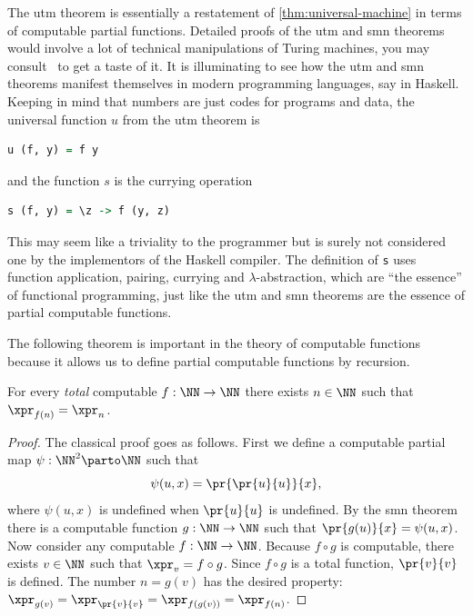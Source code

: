\noindent
The utm theorem is essentially a restatement of
\cref{thm:universal-machine} in terms of computable partial
functions. Detailed proofs of the utm and smn theorems would involve
a lot of technical manipulations of Turing machines, you may consult~ to get a taste of it.
It is illuminating to see how the utm and smn theorems manifest themselves in modern programming languages, say in Haskell. Keeping in mind that numbers are just codes for programs and data, the universal function $u$ from the utm theorem is
%
\begin{lstlisting}[language=Haskell]
u (f, y) = f y
\end{lstlisting}
%
and the function $s$ is the currying operation
%
\begin{lstlisting}[language=Haskell]
s (f, y) = \z -> f (y, z)
\end{lstlisting}
%
This may seem like a triviality to the programmer but is surely not
considered one by the implementors of the Haskell compiler. The definition of \lstinline!s! uses function application, pairing, currying and $\lambda$-abstraction, which are ``the essence'' of functional programming, just like the utm and smn theorems are the essence of partial computable functions.

The following theorem is important in the theory of computable
functions because it allows us to define partial computable functions
by recursion.

\begin{theorem}
  For every \emph{total} computable $f : \NN \to \NN$ there exists $n
  \in \NN$ such that $\xpr_{f(n)} = \xpr_{n}$.
\end{theorem}

\begin{proof}
  The classical proof goes as follows. First we define a computable
  partial map $\psi : \NN^2 \parto \NN$ such that
  \begin{equation*}
    \psi(u, x) = \pr{\pr{u}{u}}{x},
  \end{equation*}
  where $\psi(u, x)$ is undefined when $\pr{u}{u}$ is undefined.
  By the smn theorem there is a computable function $g : \NN \to \NN$
  such that $\pr{g(u)}{x} = \psi(u, x)$. Now consider any computable
  $f : \NN \to \NN$. Because $f \circ g$ is computable, there exists
  $v \in \NN$ such that $\xpr_{v} = f \circ g$. Since $f \circ g$ is a
  total function, $\pr{v}{v}$ is defined. The number $n = g(v)$ has
  the desired property:
  $\xpr_{g(v)} = \xpr_{\pr{v}{v}} = \xpr_{f(g(v))} = \xpr_{f(n)}$.
\end{proof}

